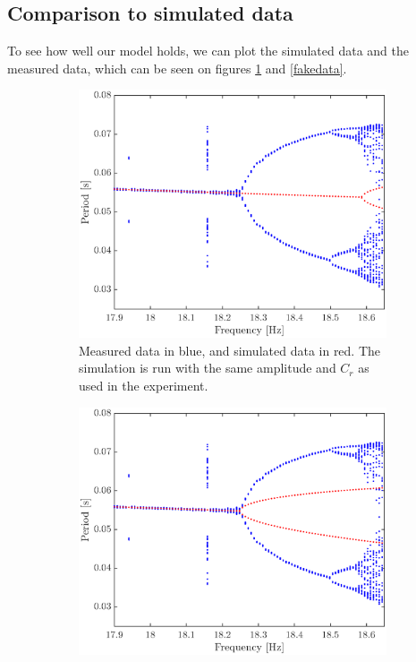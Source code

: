\documentclass[12pt,oneside,a4paper]{article}
\numberwithin{equation}{section}
\begin{document}
{{{{\subsection{Comparison to simulated data}
To see how well our model holds, we can plot the simulated data and the measured data, which can be seen on figures \ref{realdata} and \ref{fakedata}. 
\begin{figure}
\centering
\begin{subfigure}[t]{0.49\textwidth}
	\centering
	\includegraphics[width=\textwidth]{realvals}
	\caption{Measured data in blue, and simulated data in red. The simulation is run with the same amplitude and $C_r$ as used in the experiment.}
	\label{realdata}
\end{subfigure}\hfill
\begin{subfigure}[t]{0.49\textwidth}
	\centering
	\includegraphics[width=\textwidth]{fakevals}

\end{subfigure}
\end{figure}}}}}
\end{document}
